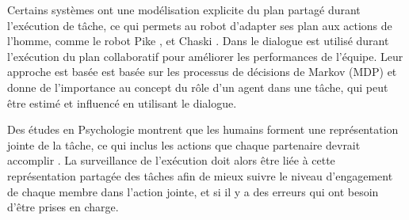\documentclass[a4paper,11pt,twoside]{StyleThese}
\begin{document}


Certains systèmes ont une modélisation explicite du plan partagé durant l'exécution de tâche, ce qui permets au robot d'adapter ses plan aux actions de l'homme, comme le robot Pike
\cite{levine2014concurrent,karpas2015robust}, et Chaski \cite{shah2011improved}.
Dans \cite{clairrobot} le dialogue est utilisé durant l'exécution du plan collaboratif pour améliorer les performances de l'équipe. Leur approche est basée est basée sur les processus de décisions de Markov (MDP) et donne de l'importance au concept du rôle d'un agent dans une tâche, qui peut être estimé et influencé en utilisant le dialogue.

Des études en Psychologie montrent que les humains forment une représentation jointe de la tâche, ce qui inclus les actions que chaque partenaire devrait accomplir \cite{sebanz2006joint}. La surveillance de l'exécution doit alors être liée à cette représentation partagée des tâches afin de mieux suivre le niveau d'engagement de chaque membre dans l'action jointe, et si il y a des erreurs qui ont besoin d'être prises en charge.






 
\end{document}
